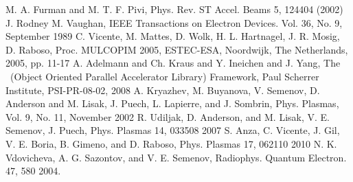 \documentclass[a4paper,11pt]{article}
\begin{document}
\begin{thebibliography}{99}
 M. A. Furman and M. T. F. Pivi,  
Phys. Rev. ST Accel. Beams 5, 124404 (2002)
 J. Rodney M. Vaughan, IEEE Transactions on Electron Devices. Vol. 36, No. 9, September 1989
 C. Vicente, M. Mattes, D. Wolk, H. L. Hartnagel, J. R. Mosig, D. Raboso, Proc. MULCOPIM 2005, ESTEC-ESA, Noordwijk, The Netherlands, 2005, pp. 11-17
 A. Adelmann and Ch. Kraus and Y. Ineichen and  J. Yang,
The \opal\ (Object Oriented Parallel Accelerator Library) 
              Framework, Paul Scherrer Institute, PSI-PR-08-02, 2008
 A. Kryazhev, M. Buyanova, V. Semenov, D. Anderson and M. Lisak, J. Puech, L. Lapierre, and J. Sombrin,
Phys. Plasmas, Vol. 9, No. 11, November 2002
 R. Udiljak, D. Anderson, and M. Lisak, V. E. Semenov, J. Puech, Phys. Plasmas 14, 033508 2007
 S. Anza, C. Vicente, J. Gil, V. E. Boria, B. Gimeno, and D. Raboso, Phys. Plasmas 17, 062110 2010
 N. K. Vdovicheva, A. G. Sazontov, and V. E. Semenov, Radiophys. Quantum Electron. 47, 580 2004.

\end{thebibliography} 
\end{document}
